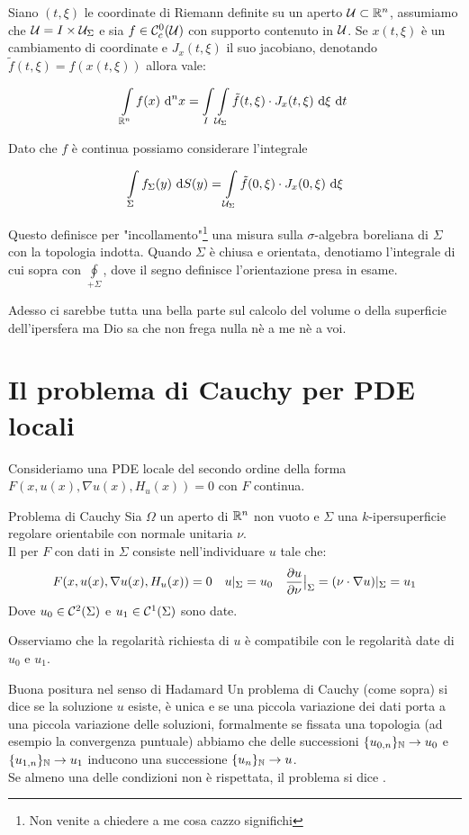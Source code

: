 \documentclass{book}
\begin{document}
Siano $(t,\xi)$ le coordinate di Riemann definite su un aperto $\mathcal{U} \subset \mathbb{R}^n$, assumiamo che $\mathcal{U}=I\times\mathcal{U}_\Sigma$ e sia $f \in \mathcal{C}_c^0(\mathcal{U})$ con supporto contenuto in $\mathcal{U}$. Se $x(t,\xi)$ è un cambiamento di coordinate e $J_x(t,\xi)$ il suo jacobiano, denotando $\tilde{f}(t,\xi) = f(x(t,\xi))$ allora vale:

\[\int\limits_{\mathbb{R}^n} f(x)\text{ d}^n x = \int\limits_I \int\limits_{\mathcal{U}_\Sigma} \tilde{f}(t,\xi) \cdot J_x(t,\xi) \text{ d}\xi\text{ d} t \]

Dato che $f$ è continua possiamo considerare l'integrale

\[\int\limits_\Sigma f_\Sigma(y) \text{ d} S(y) = \int\limits_{\mathcal{U}_\Sigma}\tilde{f}(0,\xi) \cdot J_x(0,\xi) \text{ d}\xi\]

Questo definisce per "incollamento"\footnote{Non venite a chiedere a me cosa cazzo significhi} una misura sulla $\sigma$-algebra boreliana di $\Sigma$ con la topologia indotta. Quando $\Sigma$ è chiusa e orientata, denotiamo l'integrale di cui sopra con $\oint\limits_{+\Sigma}$, dove il segno definisce l'orientazione presa in esame.

Adesso ci sarebbe tutta una bella parte sul calcolo del volume o della superficie dell'ipersfera ma Dio sa che non frega nulla nè a me nè a voi.

\section{Il problema di Cauchy per PDE locali}

Consideriamo una PDE locale del secondo ordine della forma $F(x,u(x),\nabla u(x), H_u(x)) = 0$ con $F$ continua.

\begin{definition}{Problema di Cauchy}{}
    Sia $\Omega$ un aperto di $\mathbb{R}^n$ non vuoto e $\Sigma$ una $k$-ipersuperficie regolare orientabile con normale unitaria $\nu$.\\
    Il  per $F$ con dati in $\Sigma$ consiste nell'individuare $u$ tale che:
    \[F(x,u(x),\nabla u(x), H_u(x)) = 0 \quad u|_\Sigma = u_0 \quad \frac{\partial u}{\partial \nu}\big{|}_\Sigma = (\nu \cdot \nabla u)|_\Sigma = u_1\]
    Dove $u_0 \in \mathcal{C}^2(\Sigma)$ e $u_1 \in \mathcal{C}^1(\Sigma)$ sono date.
\end{definition}

Osserviamo che la regolarità richiesta di $u$ è compatibile con le regolarità date di $u_0$ e $u_1$.

\begin{definition}{Buona positura nel senso di Hadamard}{}
    Un problema di Cauchy (come sopra) si dice  se la soluzione $u$ esiste, è unica e se una piccola variazione dei dati porta a una piccola variazione delle soluzioni, formalmente se fissata una topologia (ad esempio la convergenza puntuale) abbiamo che delle successioni $\{u_{0,n}\}_{\mathbb{N}}\to u_0$ e $\{u_{1,n}\}_{\mathbb{N}}\to u_1$ inducono una successione $\{u_n\}_{\mathbb{N}}\to u$.\\
    Se almeno una delle condizioni non è rispettata, il problema si dice .
\end{definition}
\end{document}
